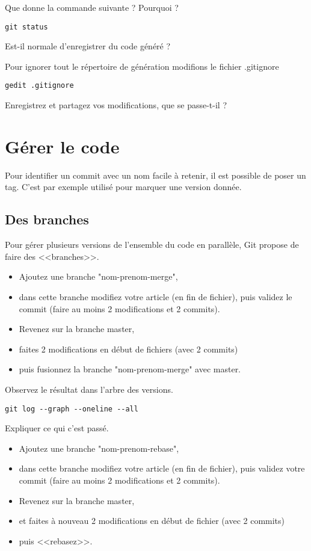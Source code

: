 \documentclass[a4paper]{article}
\begin{document}
Que donne la commande suivante ? Pourquoi ? 
\begin{verbatim}
git status
\end{verbatim}

Est-il normale d'enregistrer du code généré ? 

Pour ignorer tout le répertoire de génération modifions le fichier .gitignore
\begin{verbatim}
gedit .gitignore
\end{verbatim}

Enregistrez et partagez vos modifications, que se passe-t-il ? 

\section{Gérer le code}

Pour identifier un commit avec un nom facile à retenir, il est possible de poser un tag. C'est par exemple utilisé pour marquer une version donnée.

\subsection{Des branches}

Pour gérer plusieurs versions de l'ensemble du code en parallèle, Git propose de faire des <<branches>>.

\begin{itemize}
  \item Ajoutez une branche "nom-prenom-merge", 
  \item dans cette branche modifiez votre article (en fin de fichier), puis validez le commit (faire au moins 2 modifications et 2 commits). 
  \item Revenez sur la branche master, 
  \item faites 2 modifications en début de fichiers (avec 2 commits) 
  \item puis fusionnez la branche "nom-prenom-merge" avec master.
\end{itemize}

Observez le résultat dans l'arbre des versions. 
\begin{verbatim}
git log --graph --oneline --all
\end{verbatim}

Expliquer ce qui c'est passé.

\begin{itemize}
  \item Ajoutez une branche "nom-prenom-rebase", 
  \item dans cette branche modifiez votre article (en fin de fichier), puis validez votre commit (faire au moins 2 modifications et 2 commits). 
  \item Revenez sur la branche master, 
  \item et faites à nouveau 2 modifications en début de fichier (avec 2 commits) 
  \item puis <<rebasez>>.
\end{itemize}
\end{document}
